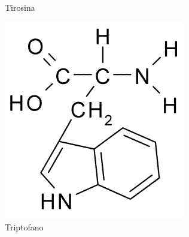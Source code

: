 \begin{figure}[H]
\begin{center}
\begin{minipage}{0.3\linewidth}
			\caption{Tirosina}
			\label{fig:tyrosine}
		\end{minipage}
		\begin{minipage}{0.3\linewidth}
			\centering   
			\includegraphics[width=0.7\linewidth]{secProteins/figures/tryptophan.png}
			\caption{Triptofano}
			\label{fig:tryptophan}
		\end{minipage}
	\end{center}
\end{figure}

